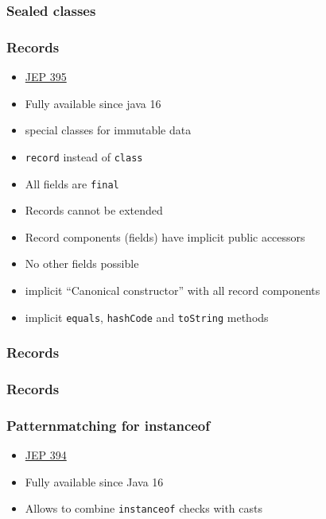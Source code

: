 \documentclass{beamer}
\begin{document}
\begin{frame}
\frametitle{Sealed classes}





\end{frame}

\begin{frame}
\frametitle{Records}
\begin{itemize}
  \item \href{https://openjdk.org/jeps/395}{JEP 395}
  \item Fully available since java 16
  \pause
  \item special classes for immutable data
  \item \texttt{record} instead of \texttt{class}
  \item All fields are \texttt{final}
  \item Records cannot be extended
  \item Record components (fields) have implicit public accessors
  \item No other fields possible
  \item implicit ``Canonical constructor'' with all record components
  \item implicit \texttt{equals}, \texttt{hashCode} and \texttt{toString} methods
\end{itemize}
\end{frame}
\begin{frame}
\frametitle{Records}

\end{frame}
\begin{frame}
\frametitle{Records}

\end{frame}

\begin{frame}
\frametitle{Patternmatching for instanceof}
\begin{itemize}
  \item \href{https://openjdk.org/jeps/394}{JEP 394}
  \item Fully available since Java 16
  \pause
  \item Allows to combine \texttt{instanceof} checks with casts
\end{itemize}
\pause

\end{frame}
\end{document}
